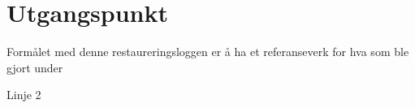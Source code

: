 \chapter{Utgangspunkt}
\setlength{\parindent}{2ex}
Formålet med denne restaureringsloggen er å ha et referanseverk for hva som ble gjort under \par
Linje 2
